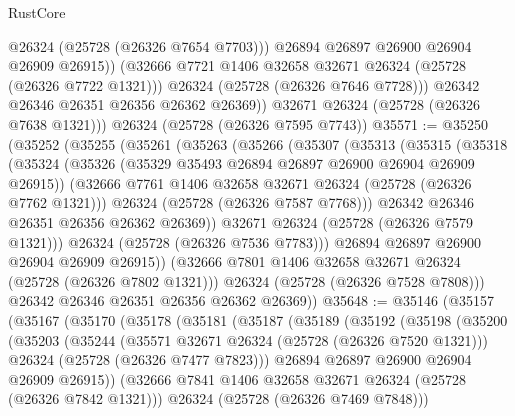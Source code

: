 \begin{lexlean}{RustCore}
\begin{coremodule}
                  @26324
                  (@25728 (@26326 @7654 @7703)))
                @26894
                @26897
                @26900
                @26904
                @26909
                @26915))
            (@32666 @7721 @1406 @32658 @32671 @26324 (@25728 (@26326 @7722 @1321)))
            @26324
            (@25728 (@26326 @7646 @7728)))
          @26342
          @26346
          @26351
          @26356
          @26362
          @26369))
      @32671
      @26324
      (@25728 (@26326 @7638 @1321)))
    @26324
    (@25728 (@26326 @7595 @7743))
@35571 := @35250
    (@35252
      (@35255
        (@35261
          (@35263
            (@35266
              (@35307
                (@35313
                  (@35315
                    (@35318
                      (@35324
                        (@35326 (@35329 @35493 @26894 @26897 @26900 @26904 @26909 @26915))
                        (@32666 @7761 @1406 @32658 @32671 @26324 (@25728 (@26326 @7762 @1321)))
                        @26324
                        (@25728 (@26326 @7587 @7768)))
                      @26342
                      @26346
                      @26351
                      @26356
                      @26362
                      @26369))
                  @32671
                  @26324
                  (@25728 (@26326 @7579 @1321)))
                @26324
                (@25728 (@26326 @7536 @7783)))
              @26894
              @26897
              @26900
              @26904
              @26909
              @26915))
          (@32666 @7801 @1406 @32658 @32671 @26324 (@25728 (@26326 @7802 @1321)))
          @26324
          (@25728 (@26326 @7528 @7808)))
        @26342
        @26346
        @26351
        @26356
        @26362
        @26369))
@35648 := @35146
    (@35157
      (@35167
        (@35170
          (@35178
            (@35181
              (@35187
                (@35189
                  (@35192
                    (@35198
                      (@35200
                        (@35203
                          (@35244
                            (@35571 @32671 @26324 (@25728 (@26326 @7520 @1321)))
                            @26324
                            (@25728 (@26326 @7477 @7823)))
                          @26894
                          @26897
                          @26900
                          @26904
                          @26909
                          @26915))
                      (@32666 @7841 @1406 @32658 @32671 @26324 (@25728 (@26326 @7842 @1321)))
                      @26324
                      (@25728 (@26326 @7469 @7848)))

\end{coremodule}
\end{lexlean}
